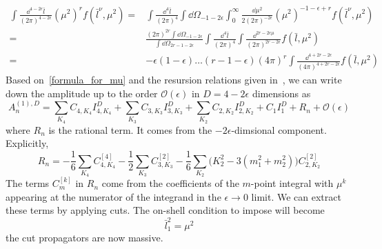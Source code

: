 \begin{equation}\label{formula_for_mu}
\begin{split}
\int\frac{\dd^{4-2\epsilon} \bar{l}}{(2\pi)^{4-2\epsilon}} (\mu^2)^rf(
\bar{l}^\nu,\mu^2) 
= & \int\frac{\dd^{4} \bar{l}}{(2\pi)^{4}} \int \dd\Omega_{-1-2\epsilon}\int_0^\infty \frac{\dd \mu^2}{2(2\pi)^{-2\epsilon}}(\mu^2)^{-1-\epsilon +r}f(\bar{l}^\nu, \mu^2)
\\ 
= & \frac{(2\pi)^{2r}\int\dd\Omega_{-1-2\epsilon}}{\int\dd\Omega_{2r-1-2\epsilon}} 
\int\frac{\dd^4 \bar{l}}{(2\pi)^4}\int\frac{\dd^{2r-2\epsilon \mu}}{(2\pi)^{2r-2\epsilon}}f(\bar{l},\mu^2)
\\
= &
-\epsilon(1-\epsilon)\ldots(r-1-\epsilon)(4\pi)^{r}\int\frac{\dd^{4+2r-2\epsilon}}{(4\pi)^{4+2r-2\epsilon}}f(\bar{l},\mu^2)
\end{split}
\end{equation}
Based on~\cref{formula_for_mu} and the resursion relations given in~\cite{Bern:1993kr}, we can write down the amplitude up to the order $\mathcal{O}(\epsilon)$ in $D = 4-2\epsilon$ dimensions as
\begin{equation}
A_n^{(1),D} = \sum_{K_4}C_{4,K_4} I_{4,K_4}^{D} +
\sum_{K_3}C_{3,K_3} I_{3,K_3}^{D}+
\sum_{K_2}C_{2,K_2} I_{2,K_2}^{D}+
C_1 I_1^{D} + R_n + \mathcal{O}(\epsilon)
\end{equation}
where $R_n$ is the rational term. It comes from the $-2\epsilon$-dimsional component.
\\
Explicitly,
\begin{equation}
R_n = -\frac{1}{6}\sum_{K_4}C_{4,K_4}^{[4]} - \frac{1}{2}\sum_{K_3}C_{3,K_3}^{[2]} - 
\frac{1}{6}\sum_{K_2}\big(K_2^2 - 3(m_1^2 + m_2^2)\big)C_{2,K_2}^{[2]}
\end{equation}
The terms $C_m^{[k]}$ in $R_n$ come from the coefficients of the $m$-point integral with $\mu^k$ appearing at the numerator of the integrand in the $\epsilon\rightarrow 0 $ limit.
We can extract these terms by applying cuts. 
The on-shell condition to impose will become
\begin{equation}
\bar{l}_1^2 = \mu^2
\end{equation}
\ie the cut propagators are now massive.
%
%
